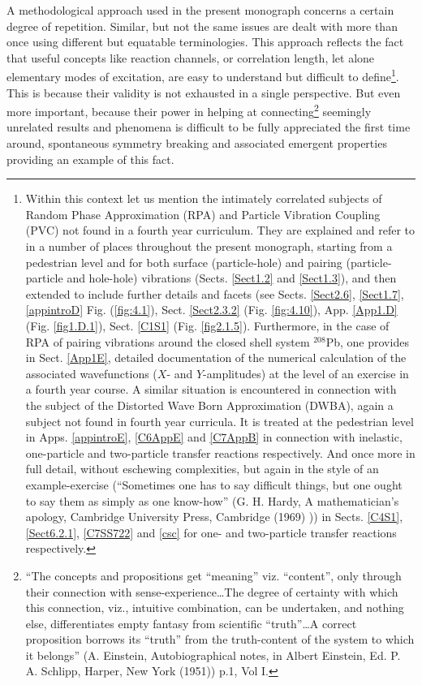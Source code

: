 A methodological approach used in the present monograph concerns a certain degree of repetition. Similar, but not the same issues are dealt with more than once using different but equatable terminologies. This approach reflects the fact that useful concepts like reaction channels, or correlation length, let alone elementary modes of excitation, are easy to understand but difficult to define\footnote{Within this context let us mention the intimately correlated subjects of Random Phase Approximation (RPA) and Particle Vibration Coupling (PVC) not found in a fourth year curriculum. They are explained and refer to in a number of places throughout the present monograph, starting from a pedestrian level and for both surface (particle-hole) and pairing (particle-particle and hole-hole) vibrations (Sects. \ref{Sect1.2} and \ref{Sect1.3}), and then extended to include further details and facets (see Sects. \ref{Sect2.6}, \ref{Sect1.7}, \ref{appintroD} Fig. (\ref{fig:4.1}), Sect. \ref{Sect2.3.2} (Fig. \ref{fig:4.10}), App. \ref{App1.D} (Fig. \ref{fig1.D.1}), Sect. \ref{C1S1} (Fig. \ref{fig2.1.5}). Furthermore, in the case of RPA of pairing vibrations around the closed shell system $^{208}$Pb, one provides in Sect. \ref{App1E}, detailed documentation of the numerical calculation of the associated wavefunctions ($X$- and $Y$-amplitudes) at the level of an exercise in a fourth year course. A similar situation is encountered in connection with the subject of the Distorted Wave Born Approximation (DWBA), again a subject not found in fourth year curricula. It is treated at the pedestrian level in Apps. \ref{appintroE}, \ref{C6AppE} and \ref{C7AppB} in connection with inelastic, one-particle and two-particle transfer reactions respectively. And once more in full detail, without eschewing complexities, but again in the style of an example-exercise (``Sometimes one has to say difficult things, but one ought to say them as simply as one know-how'' (G. H. Hardy, A mathematician's apology, Cambridge University Press, Cambridge (1969) )) in Sects. \ref{C4S1}, \ref{Sect6.2.1}, \ref{C7SS722} and \ref{csc} for one- and two-particle transfer reactions respectively.}. This is because their validity is not exhausted in a single perspective. But even more important, because their power in helping at connecting\footnote{``The concepts and propositions get ``meaning'' viz. ``content'', only through their connection with sense-experience\dots The degree of certainty with which this connection, viz., intuitive combination, can be undertaken, and nothing else, differentiates empty fantasy from scientific ``truth''\dots A correct proposition borrows its ``truth'' from the truth-content of the system to which it belongs'' (A. Einstein, Autobiographical notes, in Albert Einstein, Ed. P. A. Schlipp, Harper, New York (1951)) p.1, Vol I.} seemingly unrelated results and phenomena is difficult to be fully appreciated the first time around, spontaneous symmetry breaking and associated emergent properties providing an example of this fact.


